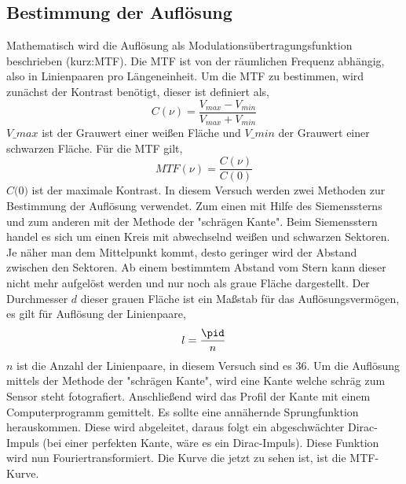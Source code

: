 \subsection{Bestimmung der Auflösung}
Mathematisch wird die Auflösung als Modulationsübertragungsfunktion beschrieben (kurz:MTF). Die MTF ist von der räumlichen Frequenz abhängig, also in Linienpaaren pro Längeneinheit. Um die MTF zu bestimmen, wird zunächst der Kontrast benötigt, dieser ist definiert als,
\begin{equation}
C(\nu)=\frac{V_{max}-V_{min}}{V_{max}+V_{min}}
\end{equation}
$ \textit{V_{max}} $ ist der Grauwert einer weißen Fläche und $ \textit{V_{min}} $ der Grauwert einer schwarzen Fläche. Für die MTF gilt,
\begin{equation}
MTF(\nu)=\frac{C(\nu)}{C(0)}
\end{equation}
$ \textit{C(0)} $ ist der maximale Kontrast.
In diesem Versuch werden zwei Methoden zur Bestimmung der Auflösung verwendet. Zum einen mit Hilfe des Siemenssterns und zum anderen mit der Methode der "schrägen Kante".
Beim Siemensstern handel es sich um einen Kreis mit abwechselnd weißen und schwarzen Sektoren. Je näher man dem Mittelpunkt kommt, desto geringer wird der Abstand zwischen den Sektoren. Ab einem bestimmtem Abstand vom Stern kann dieser nicht mehr aufgelöst werden und nur noch als graue Fläche dargestellt. Der Durchmesser $ \textit{d} $ dieser grauen Fläche ist ein Maßstab für das Auflösungsvermögen, es gilt für Auflösung der Linienpaare,
\begin{equation}
l=\frac{\pid}{n}
\end{equation}
$ \textit{n} $ ist die Anzahl der Linienpaare, in diesem Versuch sind es 36.
Um die Auflösung mittels der Methode der "schrägen Kante", wird eine Kante welche schräg zum Sensor steht fotografiert. Anschließend wird das Profil der Kante mit einem Computerprogramm gemittelt. Es sollte eine annähernde Sprungfunktion herauskommen. Diese wird abgeleitet, daraus folgt ein abgeschwächter Dirac-Impuls (bei einer perfekten Kante, wäre es ein Dirac-Impuls). Diese Funktion wird nun Fouriertransformiert.
Die Kurve die jetzt zu sehen ist, ist die MTF-Kurve.